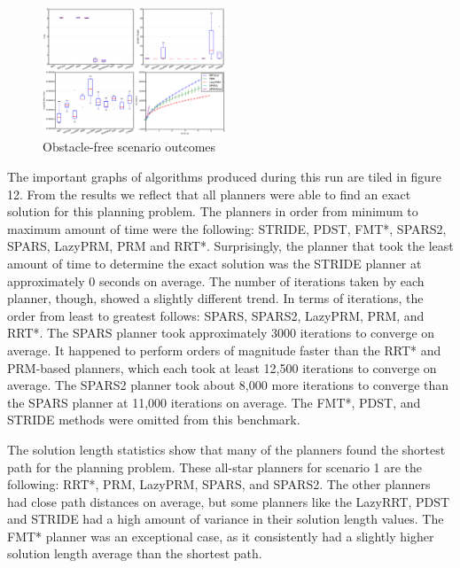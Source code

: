 \documentclass[conference]{IEEEtran} \usepackage[T1]{fontenc} \usepackage[backend=biber, style=ieee]{biblatex}
\begin{document}
\begin{figure}
\label{figure12} 
\centering 
\includegraphics[width=0.49\textwidth]{s1_outcomes}
\caption{Obstacle-free scenario outcomes}
\end{figure}

The important graphs of algorithms produced during this run are tiled in figure 12. From the results we reflect that all planners were able to find an exact solution
for this planning problem. The planners in order from minimum to maximum amount of time were the following: STRIDE, PDST, FMT*, SPARS2, SPARS, LazyPRM, PRM and RRT*. 
Surprisingly, the planner that took the least amount of time to determine the exact solution was the STRIDE planner at approximately 0 seconds on average. The number
of iterations taken by each planner, though, showed a slightly different trend. In terms of iterations, the order from least to greatest follows: SPARS, SPARS2, LazyPRM, PRM,
and RRT*. The SPARS planner took approximately 3000 iterations to converge on average. It happened to perform orders of magnitude faster than the RRT* and PRM-based planners, which 
each took at least 12,500 iterations to converge on average. The SPARS2 planner took about 8,000 more iterations to converge than the SPARS planner at 11,000 iterations on average.
The FMT*, PDST, and STRIDE methods were omitted from this benchmark.

The solution length statistics show that many of the planners found the shortest path for the planning problem. These all-star planners for scenario 1 are the following: RRT*,
PRM, LazyPRM, SPARS, and SPARS2. The other planners had close path distances on average, but some planners like the LazyRRT, PDST and STRIDE had a high amount of variance in 
their solution length values. The FMT* planner was an exceptional case, as it consistently had a slightly higher solution length average than the shortest path.
\end{document}
